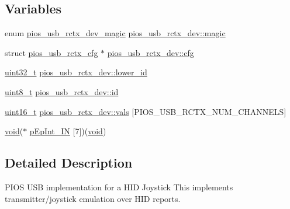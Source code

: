 \subsection*{Variables}
\begin{DoxyCompactItemize}
\item 
enum \hyperlink{group___p_i_o_s___u_s_b___r_c_t_x_gab6be8817fc2ea56ea36728686255d0dc}{pios\-\_\-usb\-\_\-rctx\-\_\-dev\-\_\-magic} \hyperlink{group___p_i_o_s___u_s_b___r_c_t_x_ga8f71b1caefbf4e9ed2a032bd56d63c73}{pios\-\_\-usb\-\_\-rctx\-\_\-dev\-::magic}
\item 
struct \hyperlink{structpios__usb__rctx__cfg}{pios\-\_\-usb\-\_\-rctx\-\_\-cfg} $\ast$ \hyperlink{group___p_i_o_s___u_s_b___r_c_t_x_gafd4556f7f9de22ef19636d97457b59b5}{pios\-\_\-usb\-\_\-rctx\-\_\-dev\-::cfg}
\item 
\hyperlink{stdint_8h_a435d1572bf3f880d55459d9805097f62}{uint32\-\_\-t} \hyperlink{group___p_i_o_s___u_s_b___r_c_t_x_gab5b742c93aa7545ca0a497ffb8b0c298}{pios\-\_\-usb\-\_\-rctx\-\_\-dev\-::lower\-\_\-id}
\item 
\hyperlink{stdint_8h_aba7bc1797add20fe3efdf37ced1182c5}{uint8\-\_\-t} \hyperlink{group___p_i_o_s___u_s_b___r_c_t_x_ga6fff63358d7474743285bfc4a0297d46}{pios\-\_\-usb\-\_\-rctx\-\_\-dev\-::id}
\item 
\hyperlink{stdint_8h_a273cf69d639a59973b6019625df33e30}{uint16\-\_\-t} \hyperlink{group___p_i_o_s___u_s_b___r_c_t_x_ga980974676b9de61965d90ed45d5ccab3}{pios\-\_\-usb\-\_\-rctx\-\_\-dev\-::vals} \mbox{[}P\-I\-O\-S\-\_\-\-U\-S\-B\-\_\-\-R\-C\-T\-X\-\_\-\-N\-U\-M\-\_\-\-C\-H\-A\-N\-N\-E\-L\-S\mbox{]}
\item 
\hyperlink{group___n_a_m_e_ga18028b8badbf1ea7e704ccac3c488e82}{void}($\ast$ \hyperlink{group___p_i_o_s___u_s_b___r_c_t_x_ga0992c19a0f2e317fcd93f755d316a0fd}{p\-Ep\-Int\-\_\-\-I\-N} \mbox{[}7\mbox{]})(\hyperlink{group___n_a_m_e_ga18028b8badbf1ea7e704ccac3c488e82}{void})
\end{DoxyCompactItemize}


\subsection{Detailed Description}
P\-I\-O\-S U\-S\-B implementation for a H\-I\-D Joystick  This implements transmitter/joystick emulation over H\-I\-D reports. 

